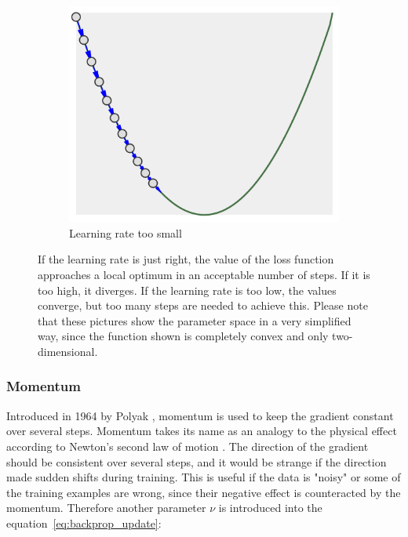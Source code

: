 \begin{figure}
\begin{subfigure}[b]{0.3\textwidth}
        \includegraphics[width=\textwidth]{images/lr_too_low.png}
        \caption{Learning rate too small}
        \label{fig:lr_too-low}
    \end{subfigure}
    \caption{If the learning rate is just right, the value of the loss function approaches a local optimum in an acceptable number of steps.
    If it is too high, it diverges.
    If the learning rate is too low, the values converge, but too many steps are needed to achieve this.
    Please note that these pictures show the parameter space in a very simplified way, since the function shown is completely convex and only two-dimensional.}
    \label{fig:learning_rate}
\end{figure}

\subsubsection{Momentum}

Introduced in 1964 by Polyak \cite{Polyak1964}, momentum is used to keep the gradient constant over several steps.
Momentum takes its name as an analogy to the physical effect according to Newton's second law of motion \cite[p.12]{Newton1687}.
The direction of the gradient should be consistent over several steps, and it would be strange if the direction made sudden shifts during training.
This is useful if the data is "noisy" or some of the training examples are wrong, since their negative effect is counteracted by the momentum.
Therefore another parameter $\nu$ is introduced into the equation~\eqref{eq:backprop_update}:

